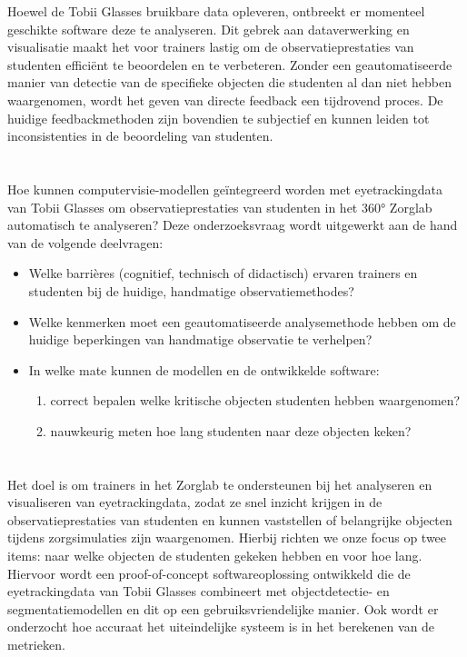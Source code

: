 Hoewel de Tobii Glasses bruikbare data opleveren, ontbreekt er momenteel geschikte software deze te analyseren.
Dit gebrek aan dataverwerking en visualisatie maakt het voor trainers lastig om de observatieprestaties van studenten efficiënt te beoordelen en te verbeteren.
Zonder een geautomatiseerde manier van detectie van de specifieke objecten die studenten al dan niet hebben waargenomen, wordt het geven van directe feedback een tijdrovend proces. 
De huidige feedbackmethoden zijn bovendien te subjectief en kunnen leiden tot inconsistenties in de beoordeling van studenten.

\section{}%
\label{sec:onderzoeksvraag}

Hoe kunnen computervisie-modellen geïntegreerd worden met eyetrackingdata van Tobii Glasses om observatieprestaties van studenten in het 360° Zorglab automatisch te analyseren?
Deze onderzoeksvraag wordt uitgewerkt aan de hand van de volgende deelvragen:
\begin{itemize}
    \item Welke barrières (cognitief, technisch of didactisch) ervaren trainers en studenten bij de huidige, handmatige observatiemethodes?
    \item Welke kenmerken moet een geautomatiseerde analysemethode hebben om de huidige beperkingen van handmatige observatie te verhelpen?
    \item In welke mate kunnen de modellen en de ontwikkelde software:
        \begin{enumerate}
            \item correct bepalen welke kritische objecten studenten hebben waargenomen?
            \item nauwkeurig meten hoe lang studenten naar deze objecten keken?
        \end{enumerate}
\end{itemize}

\section{}%
\label{sec:onderzoeksdoelstelling}

Het doel is om trainers in het Zorglab te ondersteunen bij het analyseren en visualiseren van eyetrackingdata, zodat ze snel inzicht krijgen in de observatieprestaties van studenten en kunnen 
vaststellen of belangrijke objecten tijdens zorgsimulaties zijn waargenomen. Hierbij richten we onze focus op twee items: naar welke objecten de studenten gekeken hebben en voor hoe lang.
Hiervoor wordt een proof-of-concept softwareoplossing ontwikkeld die de eyetrackingdata van Tobii Glasses combineert met objectdetectie- en segmentatiemodellen en dit op een gebruiksvriendelijke manier.
Ook wordt er onderzocht hoe accuraat het uiteindelijke systeem is in het berekenen van de metrieken.

